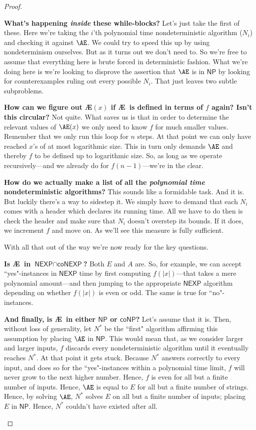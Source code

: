 \documentclass{article}
\newcommand{\nameditem}[1]{\item\textbf{#1}}
\newcommand{\NP}{\ensuremath{\textsf{NP}}}
\newcommand{\NEXP}{\ensuremath{\textsf{NEXP}}}
\newcommand{\coNP}{\ensuremath{\textsf{coNP}}}
\newcommand{\interEXP}{\ensuremath{\textsf{NEXP}\cap\textsf{coNEXP}}}
\begin{document}
\begin{proof}
\begin{description}
\begin{description}
\nameditem{What's happening \textit{inside} these while-blocks?} Let's just take the first of these. Here we're taking the $i$'th polynomial time nondeterministic algorithm ($N_i$) and checking it against $\AE$. We could try to speed this up by using nondeterminism ourselves. But as it turns out we don't need to. So we're free to assume that everything here is brute forced in deterministic fashion. What we're doing here is we're looking to disprove the assertion that $\AE$ is in $\NP$ by looking for counterexamples ruling out every possible $N_i$. That just leaves two subtle subproblems.
\begin{description}
\nameditem{How can we figure out \AE$(x)$ if \AE\ is defined in terms of $f$ again? Isn't this circular?} Not quite. What saves us is that in order to determine the relevant values of $\AE(x)$ we only need to know $f$ for much smaller values. Remember that we only run this loop for $n$ steps. At that point we can only have reached $x$'s of at most logarithmic size. This in turn only demands $\AE$ and thereby $f$ to be defined up to logarithmic size. So, as long as we operate recursively---and we already do for $f(n-1)$---we're in the clear.
\nameditem{How do we actually make a list of all the \textit{polynomial time} nondeterministic algorithms?} This sounds like a formidable task. And it is. But luckily there's a way to sidestep it. We simply have to demand that each $N_i$ comes with a header which declares its running time. All we have to do then is check the header and make sure that $N_i$ doesn't overstep its bounds. If it does, we increment $f$ and move on. As we'll see this measure is fully sufficient.
\end{description}
\end{description}
\end{description}
With all that out of the way we're now ready for the key questions.
\begin{description}
\nameditem{Is \AE\ in $\interEXP$?} Both $E$ and $A$ are. So, for example, we can accept ``yes"-instances in $\NEXP$ time by first computing $f(|x|)$---that takes a mere polynomial amount---and then jumping to the appropriate $\NEXP$ algorithm depending on whether $f(|x|)$ is even or odd. The same is true for ``no"-instances. \checkmark
\nameditem{And finally, is \AE\ in either $\NP$ or $\coNP$?} Let's assume that it is. Then, without loss of generality, let $N^*$ be the ``first" algorithm affirming this assumption by placing $\AE$ in $\NP$. This would mean that, as we consider larger and larger inputs, $f$ discards every nondeterministic algorithm until it eventually reaches $N^*$. At that point it gets stuck. Because $N^*$ answers correctly to every input, and does so for the ``yes"-instances within a polynomial time limit, $f$ will never grow to the next higher number. Hence, $f$ is even for all but a finite number of inputs. Hence, $\AE$ is equal to $E$ for all but a finite number of strings. Hence, by solving $\AE$, $N^*$ solves $E$ on all but a finite number of inputs; placing $E$ in $\NP$. Hence, $N^*$ couldn't have existed after all. \lightning
\end{description}
\end{proof}
\end{document}
